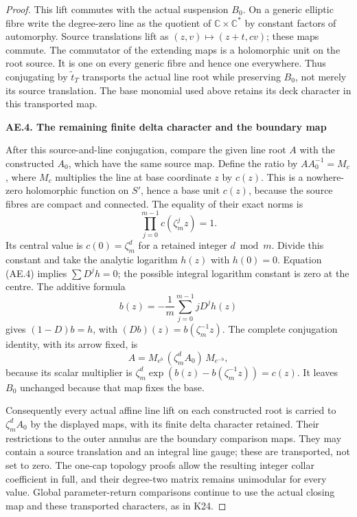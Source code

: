 \begin{proof}
This lift commutes with the actual suspension \(B_0\). On a
generic elliptic fibre write the degree-zero line as the quotient
of \(\mathbb C\times\mathbb C^*\) by constant factors of
automorphy. Source translations lift as
\((z,v)\mapsto(z+t,cv)\); these maps commute. The commutator
of the extending maps is a holomorphic unit on the root source.
It is one on every generic fibre and hence one everywhere.
Thus conjugating by \(\widetilde t_T\) transports the actual
line root while preserving \(B_0\), not merely its source
translation. The base monomial used above retains its deck
character in this transported map.

\par

\medskip\noindent\textbf{AE.4. The remaining finite delta character and the boundary map}

After this source-and-line conjugation, compare the given line
root \(A\) with the constructed \(A_0\), which have the same
source map. Define the ratio by \(AA_0^{-1}=M_c\), where
\(M_c\) multiplies the line at base coordinate \(z\) by
\(c(z)\). This is a nowhere-zero holomorphic function
on \(S'\), hence a base unit \(c(z)\), because the source
fibres are compact and connected. The equality of their exact
norms is
\[
 \prod_{j=0}^{m-1}c(\zeta_m^jz)=1.                \tag{AE.4}
\]
Its central value is \(c(0)=\zeta_m^d\) for a retained
integer \(d\bmod m\). Divide this constant and take the
analytic logarithm \(h(z)\) with \(h(0)=0\). Equation
(AE.4) implies \(\sum D^jh=0\); the possible integral
logarithm constant is zero at the centre. The additive formula
\[
 b(z)=-\frac1m\sum_{j=0}^{m-1}jD^jh(z)
\]
gives \((1-D)b=h\), with \((Db)(z)=b(\zeta_m^{-1}z)\).
The complete conjugation identity, with its arrow fixed, is
\[
 A=M_{e^b}\,(\zeta_m^dA_0)\,M_{e^{-b}},
\]
because its scalar multiplier is
\(\zeta_m^d\exp(b(z)-b(\zeta_m^{-1}z))=c(z)\).
It leaves \(B_0\) unchanged
because that map fixes the base.

Consequently every actual affine line lift on each constructed
root is carried to \(\zeta_m^dA_0\) by the displayed maps,
with its finite delta character retained. Their restrictions to
the outer annulus are the boundary comparison maps. They may
contain a source translation and an integral line gauge; these
are transported, not set to zero. The one-cap topology proofs
allow the resulting integer collar coefficient in full, and
their degree-two matrix remains unimodular for every value.
Global parameter-return comparisons continue to use the actual
closing map and these transported characters, as in K24.
\end{proof}
